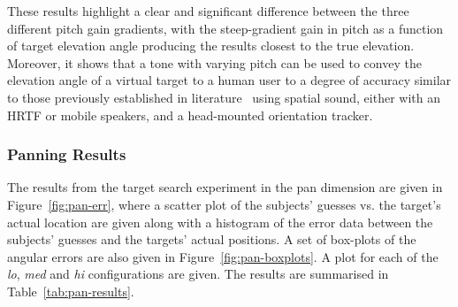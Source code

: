 \documentclass[format=sigconf, review=true, screen=true, anonymous=true]{acmart}
\begin{document}
These results highlight a clear and significant difference between the three different pitch gain gradients, with the steep-gradient gain in pitch as a function of target elevation angle producing the results closest to the true elevation. Moreover, it shows that a tone with varying pitch can be used to convey the elevation angle of a virtual target to a human user to a degree of accuracy similar to those previously established in literature~\cite{bujacz2011sonification, katz2011spatial, zotkin2004rendering} using spatial sound, either with an HRTF or mobile speakers, and a head-mounted orientation tracker.  

\subsubsection{Panning Results}

The results from the target search experiment in the pan dimension are given in Figure~\ref{fig:pan-err}, where a scatter plot of the subjects' guesses vs. the target's actual location are given along with a histogram of the error data between the subjects' guesses and the targets' actual positions. A set of box-plots of the angular errors are also given in Figure~\ref{fig:pan-boxplots}. A plot for each of the \emph{lo}, \emph{med} and \emph{hi} configurations are given. The results are summarised in Table~\ref{tab:pan-results}.




\end{document}
